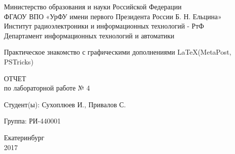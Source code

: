 \begin{titlepage}
  \begin{center}
    Министерство образования и науки Российской Федерации\\
    ФГАОУ ВПО  «УрФУ имени первого Президента России Б. Н. Ельцина»\\
    Институт радиоэлектроники и информационных технологий - РтФ\\
    Департамент информационных технологий и автоматики
    \par
    \vspace{5.5cm}
    \Large{
      Практическое знакомство с графическими дополнениями \LaTeX (MetaPost, PSTricks)
      
      \par
      \vspace{1cm}

      ОТЧЕТ\\
      по лабораторной работе № 4
    }

    \vspace{5cm}
    {
      Студент(ы): \hfill Сухоплюев И., Привалов С.
    }
    \par
    {
      Группа: \hfill РИ-440001
    }

    \par
    \vspace{4cm}
    Екатеринбург\\
    2017
  \end{center}
\end{titlepage}
